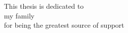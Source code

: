 \begin{dedication}
This thesis is dedicated to\\
 my family\\
for being the greatest source of support\\
\end{dedication}